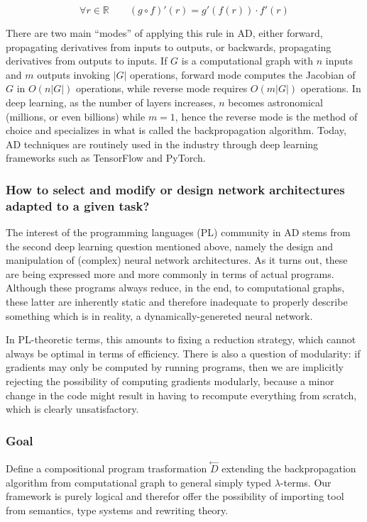 $$\forall r \in \mathbb{R} \quad \quad (g \circ f)' (r) = g'(f(r)) \cdot f'(r)$$

There are two main “modes” of applying this rule in AD, either forward, propagating derivatives from inputs to outputs, or backwards, propagating derivatives from outputs to inputs. If $G$ is a computational graph with $n$ inputs and $m$ outputs invoking $|G|$ operations, forward mode computes the Jacobian of $G$ in $O(n |G|)$ operations, while reverse mode requires $O(m |G|)$ operations. In deep learning, as the number of layers increases, $n$ becomes astronomical (millions, or even billions) while $m = 1$, hence the reverse mode is the method of choice and specializes in what is called the backpropagation algorithm. Today, AD techniques are routinely used in the industry through deep learning frameworks such as TensorFlow and PyTorch.


\subsubsection{How to select and modify or design network architectures adapted to a given task?}
The interest of the programming languages (PL) community in AD stems from the second deep learning question mentioned above, namely the design and manipulation of (complex) neural network architectures. As it turns out, these are being expressed more and more commonly in terms of actual programs. Although these programs always reduce, in the end, to computational graphs, these latter are inherently static and therefore inadequate to properly describe something which is in reality, a dynamically-genereted neural network.

In PL-theoretic terms, this amounts to fixing a reduction strategy, which cannot always be optimal in terms of efficiency. There is also a question of modularity: if gradients may only be computed by running programs, then we are implicitly rejecting the possibility of computing gradients modularly, because a minor change in the code might result in having to recompute everything from scratch, which is clearly unsatisfactory.

\subsubsection{Goal}
Define a compositional program trasformation $\stackrel{\leftarrow}{D}$ extending the backpropagation algorithm from computational graph to general simply typed $\lambda$-terms. Our framework is purely logical and therefor offer the possibility of importing tool from semantics, type systems and rewriting theory.

